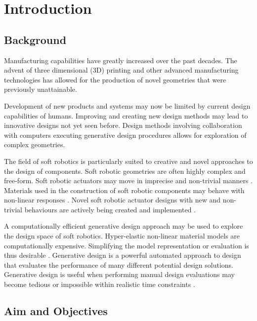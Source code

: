 \chapter{Introduction}
\label{chp:I}


\section{Background}

Manufacturing capabilities have greatly increased over the past decades. The advent of three dimensional (3D) printing and other advanced manufacturing technologies has allowed for the production of novel geometries that were previously unattainable. \citep{Buchanan2019,Luis2020}

Development of new products and systems may now be limited by current design capabilities of humans. Improving and creating new design methods may lead to innovative designs not yet seen before. Design methods involving collaboration with computers executing generative design procedures allows for exploration of complex geometries. \citep{Shea2005}

The field of soft robotics is particularly suited to creative and novel approaches to the design of components. Soft robotic geometries are often highly complex and free-form. Soft robotic actuators may move in imprecise and non-trivial manners \citep{Whitesides2018}. Materials used in the construction of soft robotic components may behave with non-linear responses \citep{Boyraz2018}. Novel soft robotic actuator designs with new and non-trivial behaviours are actively being created and implemented \citep{Ellis2020}.

A computationally efficient generative design approach may be used to explore the design space of soft robotics. Hyper-elastic non-linear material models are computationally expensive. Simplifying the model representation or evaluation is thus desirable \citep{Niroomandi2010}. Generative design is a powerful automated approach to design that evaluates the performance of many different potential design solutions. Generative design is useful when performing manual design evaluations may become tedious or impossible within realistic time constraints \citep{Brose1993}.

\section{Aim and Objectives}

